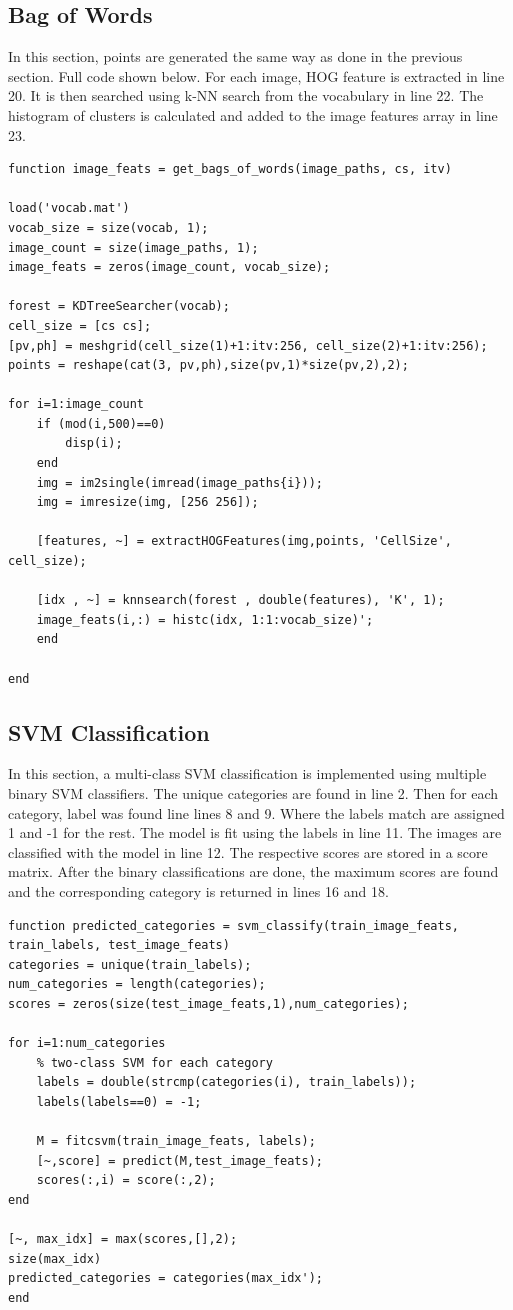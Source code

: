 \subsection{Bag of Words}
In this section, points are generated the same way as done in the previous section. Full code shown below. For each image, HOG feature is extracted in line 20. It is then searched using k-NN search from the vocabulary in line 22. The histogram of clusters is calculated and added to the image features array in line 23. 
\begin{lstlisting}[style=Matlab-editor]
function image_feats = get_bags_of_words(image_paths, cs, itv)

load('vocab.mat')
vocab_size = size(vocab, 1);
image_count = size(image_paths, 1);
image_feats = zeros(image_count, vocab_size);

forest = KDTreeSearcher(vocab);
cell_size = [cs cs];
[pv,ph] = meshgrid(cell_size(1)+1:itv:256, cell_size(2)+1:itv:256);
points = reshape(cat(3, pv,ph),size(pv,1)*size(pv,2),2);

for i=1:image_count
	if (mod(i,500)==0)
		disp(i);
	end
	img = im2single(imread(image_paths{i}));
	img = imresize(img, [256 256]);
	
	[features, ~] = extractHOGFeatures(img,points, 'CellSize', cell_size);
	
	[idx , ~] = knnsearch(forest , double(features), 'K', 1);
	image_feats(i,:) = histc(idx, 1:1:vocab_size)';
	end

end
\end{lstlisting}
\subsection{SVM Classification}
In this section, a multi-class SVM classification is implemented using multiple binary SVM classifiers. The unique categories are found in line 2. Then for each category, label was found line lines 8 and 9. Where the labels match are assigned 1 and -1 for the rest. The model is fit using the labels in line 11. The images are classified with the model in line 12. The respective scores are stored in a score matrix. After the binary classifications are done, the maximum scores are found and the corresponding category is returned in lines 16 and 18.

\begin{lstlisting}[style=Matlab-editor]
function predicted_categories = svm_classify(train_image_feats, train_labels, test_image_feats)
categories = unique(train_labels);
num_categories = length(categories);
scores = zeros(size(test_image_feats,1),num_categories);

for i=1:num_categories
	% two-class SVM for each category
	labels = double(strcmp(categories(i), train_labels));
	labels(labels==0) = -1;
	
	M = fitcsvm(train_image_feats, labels);
	[~,score] = predict(M,test_image_feats);
	scores(:,i) = score(:,2);
end

[~, max_idx] = max(scores,[],2);
size(max_idx)
predicted_categories = categories(max_idx');
end
\end{lstlisting}

